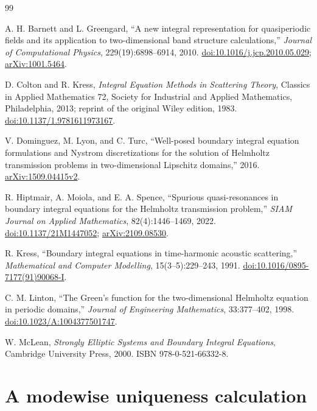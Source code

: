 \documentclass[11pt]{article}
\theoremstyle{plain}
\theoremstyle{definition}
\theoremstyle{remark}
\begin{document}
\begin{thebibliography}{99}

A. H. Barnett and L. Greengard,
``A new integral representation for quasiperiodic fields and its application
to two-dimensional band structure calculations,''
\emph{Journal of Computational Physics}, 229(19):6898--6914, 2010.
\href{https://doi.org/10.1016/j.jcp.2010.05.029}{doi:10.1016/j.jcp.2010.05.029};
\href{https://arxiv.org/abs/1001.5464}{arXiv:1001.5464}.

D. Colton and R. Kress,
\emph{Integral Equation Methods in Scattering Theory},
Classics in Applied Mathematics 72, Society for Industrial and Applied
Mathematics, Philadelphia, 2013; reprint of the original Wiley edition, 1983.
\href{https://doi.org/10.1137/1.9781611973167}{doi:10.1137/1.9781611973167}.

V. Dominguez, M. Lyon, and C. Turc,
``Well-posed boundary integral equation formulations and Nystrom
discretizations for the solution of Helmholtz transmission problems in
two-dimensional Lipschitz domains,'' 2016.
\href{https://arxiv.org/abs/1509.04415}{arXiv:1509.04415v2}.

R. Hiptmair, A. Moiola, and E. A. Spence,
``Spurious quasi-resonances in boundary integral equations for the Helmholtz
transmission problem,'' \emph{SIAM Journal on Applied Mathematics},
82(4):1446--1469, 2022.
\href{https://doi.org/10.1137/21M1447052}{doi:10.1137/21M1447052};
\href{https://arxiv.org/abs/2109.08530}{arXiv:2109.08530}.

R. Kress,
``Boundary integral equations in time-harmonic acoustic scattering,''
\emph{Mathematical and Computer Modelling}, 15(3--5):229--243, 1991.
\href{https://doi.org/10.1016/0895-7177(91)90068-I}{doi:10.1016/0895-7177(91)90068-I}.

C. M. Linton,
``The Green's function for the two-dimensional Helmholtz equation in periodic
domains,'' \emph{Journal of Engineering Mathematics}, 33:377--402, 1998.
\href{https://doi.org/10.1023/A:1004377501747}{doi:10.1023/A:1004377501747}.

W. McLean,
\emph{Strongly Elliptic Systems and Boundary Integral Equations},
Cambridge University Press, 2000.
ISBN 978-0-521-66332-8.

\end{thebibliography}

\appendix
\section{A modewise uniqueness calculation}
\end{document}
